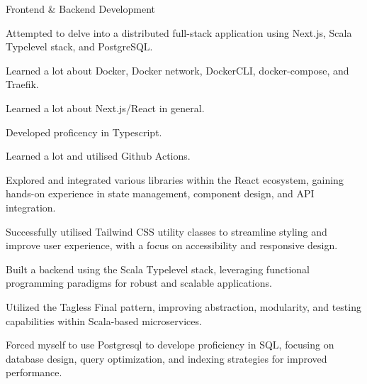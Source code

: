 
\begin{cventries}

  \cventry
    {Frontend \& Backend Development} %
    {} %
    {} %
    {} %
    {
      \begin{cvitems} %
        \item {Attempted to delve into a distributed full-stack application using Next.js, Scala Typelevel stack, and PostgreSQL.}
        \item {Learned a lot about Docker, Docker network, DockerCLI, docker-compose, and Traefik.}
        \item {Learned a lot about Next.js/React in general.}
        \item {Developed proficency in Typescript.}
        \item {Learned a lot and utilised Github Actions.}
        \item {Explored and integrated various libraries within the React ecosystem, gaining hands-on experience in state management, component design, and API integration.}
        \item {Successfully utilised Tailwind CSS utility classes to streamline styling and improve user experience, with a focus on accessibility and responsive design.}
        \item {Built a backend using the Scala Typelevel stack, leveraging functional programming paradigms for robust and scalable applications.}
        \item {Utilized the Tagless Final pattern, improving abstraction, modularity, and testing capabilities within Scala-based microservices.}
        \item {Forced myself to use Postgresql to develope proficiency in SQL, focusing on database design, query optimization, and indexing strategies for improved performance.}
      \end{cvitems}
    }


\end{cventries}

